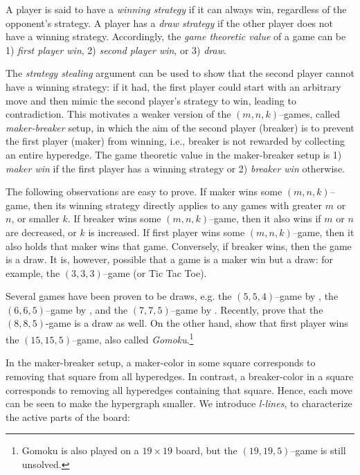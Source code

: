 \documentclass[conference]{IEEEtran}
\theoremstyle{definition}
\begin{document}
A player is said to have a \emph{winning strategy} if it can always win, regardless of the opponent's strategy. A player has a \emph{draw strategy} if the other player does not have a winning strategy. Accordingly, the \emph{game theoretic value} of a game can be 1) \emph{first player win}, 2) \emph{second player win}, or 3) \emph{draw}.

The \emph{strategy stealing} argument can be used to show that the second player cannot have a winning strategy: if it had, the first player could start with an arbitrary move and then mimic the second player's strategy to win, leading to contradiction. This motivates a weaker version of the $(m, n, k)$--games,
called \emph{maker-breaker} setup, in which the aim of the second player (breaker) is to prevent the first player (maker) from winning, i.e., breaker is not rewarded by collecting an entire hyperedge. The game theoretic value in the maker-breaker setup is 1) \emph{maker win} if the first player has a winning strategy or 2) \emph{breaker win} otherwise.

The following observations are easy to prove. If maker wins some $(m,n,k)$--game, then its winning strategy directly applies to any games with greater $m$ or $n$, or smaller $k$. If breaker wins some $(m,n,k)$--game, then it also wins if $m$ or $n$ are decreased, or $k$ is increased. 
If first player wins some $(m,n,k)$--game, then it also holds that maker wins that game. Conversely, if breaker wins, then the game is a draw. It is, however, possible that a game is a maker win but a draw: for example, the $(3,3,3)$--game (or Tic Tac Toe).

Several games have been proven to be draws, e.g. the $(5,5,4)$--game by \cite{BerlekampElwynR1983Wwfy}, the $(6,6,5)$--game by \cite{UITERWIJK200043}, and the $(7,7,5)$--game by \cite{gomoku775}. Recently, \cite{HSU202079} prove that the $(8,8,5)$-game is a draw as well. On the other hand, \cite{Allis1994SearchingFS} show that first player wins the $(15,15,5)$--game, also called \emph{Gomoku}.\footnote{Gomoku is also played on a $19 \times 19$ board, but the $(19, 19, 5)$--game is still unsolved.}

In the maker-breaker setup, a maker-color in some square corresponds to removing that square from all hyperedges. In contrast, a breaker-color in a square corresponds to removing all hyperedges containing that square. Hence, each move can be seen to make the hypergraph smaller. We introduce \emph{l-lines}, to characterize the active parts of the board:
\end{document}
